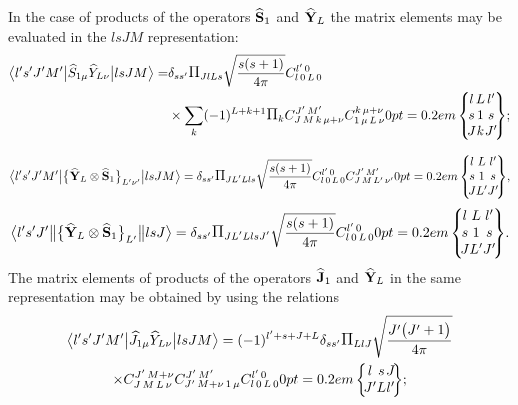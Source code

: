 In the case of products of the operators \(\widehat{\mathbf{S}}_{1}\) and \(\widehat{\mathbf{Y}}_{L}\) the matrix elements may be evaluated in the $lsJM$ representation:
\begin{align}
\braOket{ l^{\prime} s^{\prime} J^{\prime} M^{\prime}}{ \widehat{S}_{1 \mu} \widehat{Y}_{L \nu}}{l s J M}= & \delta_{s s^{\prime}} \Fact{J l L s}\sqrt{\frac{ s(s+1)}{4 \pi}}
\clebsch{l}{0}{L}{0}{l^{\prime}}{0} \notag\\
& \times \sum_{k}(-1)^{L+k+1} \Fact{k}
\clebsch{J}{M}{k}{\mu+\nu}{J^{\prime}}{M^{\prime}} 
\clebsch{1}{\mu}{L}{\nu}{k}{\mu+\nu}
\ninej{l}{L}{l^{\prime}}{s}{1}{s}{J}{k}{J^{\prime}}; \label{eq:13:2:122}
\end{align}

\begin{equation}
\braOket{ l^{\prime} s^{\prime} J^{\prime} M^{\prime}}{\bigl\{\widehat{\vect{Y}}_{L} \otimes \widehat{\vect{S}}_{1}\bigr\}_{L^{\prime} \nu^{\prime}}}{l s J M}=  \delta_{s s^{\prime}} \Fact{J L^\prime L l s}\sqrt{\frac{ s(s+1)}{4 \pi}} \clebsch{l}{0}{L}{0}{l^{\prime}}{0}
\clebsch{J}{M}{L^{\prime}}{\nu^{\prime}}{J^{\prime}}{M^{\prime}}
\ninej{l}{L}{l^{\prime}}{s}{1}{s}{J}{L^{\prime}}{J^{\prime}}, \label{eq:13:2:123}
\end{equation}
\begin{equation*}
\braOketred{ l^{\prime} s^{\prime} J^{\prime}}{\bigl\{\widehat{\vect{Y}}_{L} \otimes \widehat{\vect{S}}_{1}\bigr\}_{L^{\prime}}}{l s J}=\delta_{s s^{\prime}} \Fact{J L^\prime L l s J^{\prime}}\sqrt{\frac{ s(s+1)}{4 \pi}} 
\clebsch{l}{0}{L}{0}{l^{\prime}}{0}
\ninej{l}{L}{l^{\prime}}{s}{1}{s}{J}{L^{\prime}}{J^{\prime}}.
\end{equation*}
The matrix elements of products of the operators \(\widehat{\mathbf{J}}_{1}\) and \(\widehat{\mathbf{Y}}_{L}\) in the same representation may be obtained by using the relations
\begin{multline}
\braOket{ l^{\prime} s^{\prime} J^{\prime} M^{\prime}}{ \widehat{J}_{1 \mu} \widehat{Y}_{L \nu}}{l s J M}=(-1)^{l^{\prime}+s+J+L} \delta_{s s^{\prime}} \Fact{L l J}\sqrt{\frac{ J^{\prime}\bigl(J^{\prime}+1\bigr)}{4 \pi}}\\
\times
\clebsch{J}{M}{L}{\nu}{J^{\prime}}{M+\nu}
\clebsch{J^{\prime}}{M+\nu}{1}{\mu}{J^{\prime}}{M^{\prime}}
\clebsch{l}{0}{L}{0}{l^{\prime}}{0}
\sixj{l}{s}{J}{J^{\prime}}{L}{l^{\prime}};  \label{eq:13:2:124}
\end{multline}

